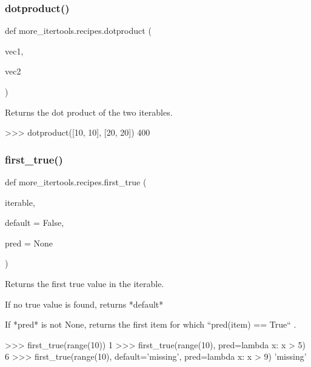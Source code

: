 \subsubsection{\texorpdfstring{dotproduct()}{dotproduct()}}
{\footnotesize\ttfamily def more\+\_\+itertools.\+recipes.\+dotproduct (\begin{DoxyParamCaption}\item[{}]{vec1,  }\item[{}]{vec2 }\end{DoxyParamCaption})}

\begin{DoxyVerb}Returns the dot product of the two iterables.

    >>> dotproduct([10, 10], [20, 20])
    400\end{DoxyVerb}
 \mbox{\label{namespacemore__itertools_1_1recipes_aa803f5a62b2be71f11d9ebf71d1f0de2}} 
\subsubsection{\texorpdfstring{first\+\_\+true()}{first\_true()}}
{\footnotesize\ttfamily def more\+\_\+itertools.\+recipes.\+first\+\_\+true (\begin{DoxyParamCaption}\item[{}]{iterable,  }\item[{}]{default = {\ttfamily False},  }\item[{}]{pred = {\ttfamily None} }\end{DoxyParamCaption})}

\begin{DoxyVerb}Returns the first true value in the iterable.

If no true value is found, returns *default*

If *pred* is not None, returns the first item for which
``pred(item) == True`` .

    >>> first_true(range(10))
    1
    >>> first_true(range(10), pred=lambda x: x > 5)
    6
    >>> first_true(range(10), default='missing', pred=lambda x: x > 9)
    'missing'\end{DoxyVerb}
 \mbox{\label{namespacemore__itertools_1_1recipes_a7b1ecd9c57f8f84daf1b7ba33054daef}} 
